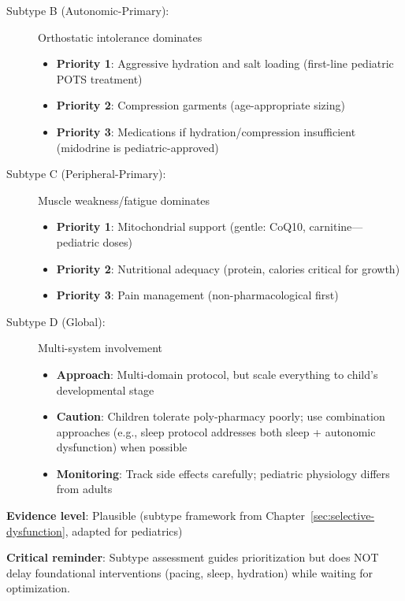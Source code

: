\begin{recommendation}
\begin{description}
    \item[Subtype B (Autonomic-Primary):] Orthostatic intolerance dominates
    \begin{itemize}
        \item \textbf{Priority 1}: Aggressive hydration and salt loading (first-line pediatric POTS treatment)
        \item \textbf{Priority 2}: Compression garments (age-appropriate sizing)
        \item \textbf{Priority 3}: Medications if hydration/compression insufficient (midodrine is pediatric-approved)
    \end{itemize}

    \item[Subtype C (Peripheral-Primary):] Muscle weakness/fatigue dominates
    \begin{itemize}
        \item \textbf{Priority 1}: Mitochondrial support (gentle: CoQ10, carnitine—pediatric doses)
        \item \textbf{Priority 2}: Nutritional adequacy (protein, calories critical for growth)
        \item \textbf{Priority 3}: Pain management (non-pharmacological first)
    \end{itemize}

    \item[Subtype D (Global):] Multi-system involvement
    \begin{itemize}
        \item \textbf{Approach}: Multi-domain protocol, but scale everything to child's developmental stage
        \item \textbf{Caution}: Children tolerate poly-pharmacy poorly; use combination approaches (e.g., sleep protocol addresses both sleep + autonomic dysfunction) when possible
        \item \textbf{Monitoring}: Track side effects carefully; pediatric physiology differs from adults
    \end{itemize}
\end{description}

\textbf{Evidence level}: Plausible (subtype framework from Chapter~\ref{sec:selective-dysfunction}, adapted for pediatrics)

\textbf{Critical reminder}: Subtype assessment guides prioritization but does NOT delay foundational interventions (pacing, sleep, hydration) while waiting for optimization.

\end{recommendation}

